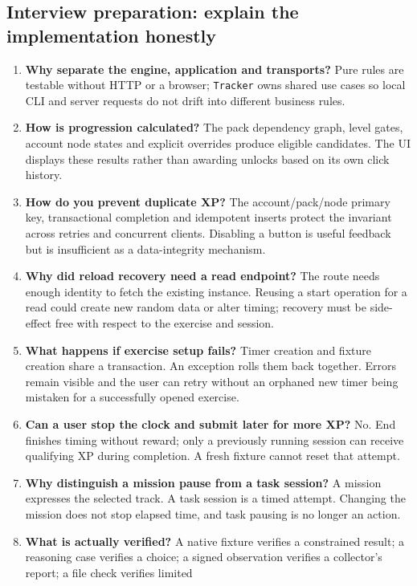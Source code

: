 \subsection{Interview preparation: explain the implementation honestly}
\begin{enumerate}
\item \textbf{Why separate the engine, application and transports?}
Pure rules are testable without HTTP or a browser; \texttt{Tracker} owns shared use
cases so local CLI and server requests do not drift into different business rules.
\item \textbf{How is progression calculated?}
The pack dependency graph, level gates, account node states and explicit overrides
produce eligible candidates. The UI displays these results rather than awarding
unlocks based on its own click history.
\item \textbf{How do you prevent duplicate XP?}
The account/pack/node primary key, transactional completion and idempotent inserts
protect the invariant across retries and concurrent clients. Disabling a button
is useful feedback but is insufficient as a data-integrity mechanism.
\item \textbf{Why did reload recovery need a read endpoint?}
The route needs enough identity to fetch the existing instance. Reusing a start
operation for a read could create new random data or alter timing; recovery must
be side-effect free with respect to the exercise and session.
\item \textbf{What happens if exercise setup fails?}
Timer creation and fixture creation share a transaction. An exception rolls them
back together. Errors remain visible and the user can retry without an orphaned
new timer being mistaken for a successfully opened exercise.
\item \textbf{Can a user stop the clock and submit later for more XP?}
No. End finishes timing without reward; only a previously running session can
receive qualifying XP during completion. A fresh fixture cannot reset that attempt.
\item \textbf{Why distinguish a mission pause from a task session?}
A mission expresses the selected track. A task session is a timed attempt. Changing
the mission does not stop elapsed time, and task pausing is no longer an action.
\item \textbf{What is actually verified?}
A native fixture verifies a constrained result; a reasoning case verifies a choice;
a signed observation verifies a collector's report; a file check verifies limited

\end{enumerate}
